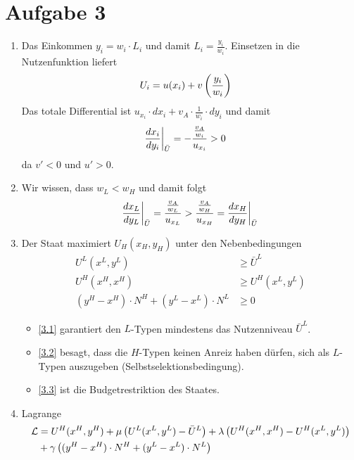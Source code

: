 \documentclass{article}
\begin{document}
	\section*{Aufgabe 3}
	\begin{enumerate}[label=(\alph*)]
		\item Das Einkommen $y_i=w_i\cdot L_i$ und damit $L_i=\frac{y_i}{w_i}$. Einsetzen in die Nutzenfunktion liefert
		\begin{align}
			U_i &= u(x_i) + v\left(\frac{y_i}{w_i}\right) \notag
		\end{align}
		Das totale Differential ist $u_{x_i}\cdot dx_i + v_A\cdot\frac{1}{w_i}\cdot dy_i$ und damit
		\begin{align}
			\frac{dx_i}{dy_i}\bigg\vert_{\bar{U}} &= -\frac{\frac{v_A}{w_i}}{u_{x_i}} >0 \notag
		\end{align}
		da $v'<0$ und $u'>0$.
		\item Wir wissen, dass $w_L<w_H$ und damit folgt
		\begin{align}
			\frac{dx_L}{dy_L}\bigg\vert_{\bar{U}} = \frac{\frac{v_A}{w_L}}{u_{x_L}} > \frac{\frac{v_A}{w_H}}{u_{x_H}} = \frac{dx_H}{dy_H}\bigg\vert_{\bar{U}} \notag
		\end{align}
		\item Der Staat maximiert $U_H(x_H,y_H)$ unter den Nebenbedingungen
		\begin{align}
			\label{3.1}
			U^L(x^L,y^L) &\ge \bar{U}^L \tag{3.1} \\
			\label{3.2}
			U^H(x^H,x^H) &\ge U^H(x^L,y^L) \tag{3.2} \\
			\label{3.3}
			(y^H-x^H)\cdot N^H + (y^L-x^L)\cdot N^L &\ge 0 \tag{3.3}
		\end{align}
		\begin{itemize}
			\item \eqref{3.1} garantiert den $L$-Typen mindestens das Nutzenniveau $\bar{U}^L$.
			\item \eqref{3.2} besagt, dass die $H$-Typen keinen Anreiz haben dürfen, sich als $L$-Typen auszugeben (Selbstselektionsbedingung).
			\item \eqref{3.3} ist die Budgetrestriktion des Staates.
		\end{itemize}
		\item Lagrange
		\begin{align}
			\mathcal{L} &= U^H(x^H,y^H) + \mu\left(U^L(x^L,y^L) - \bar{U}^L\right) + \lambda\left(U^H(x^H,x^H) - U^H(x^L,y^L)\right) \notag \\
			&+ \gamma\left((y^H-x^H)\cdot N^H + (y^L-x^L)\cdot N^L\right) \notag

\end{align}
\end{enumerate}
\end{document}
